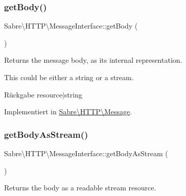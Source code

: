 \mbox{\label{interface_sabre_1_1_h_t_t_p_1_1_message_interface_a0738667a55e423f8510c84035b99f73d}} 
\subsubsection{\texorpdfstring{get\+Body()}{getBody()}}
{\footnotesize\ttfamily Sabre\textbackslash{}\+H\+T\+T\+P\textbackslash{}\+Message\+Interface\+::get\+Body (\begin{DoxyParamCaption}{ }\end{DoxyParamCaption})}

Returns the message body, as it\textquotesingle{}s internal representation.

This could be either a string or a stream.

\begin{DoxyReturn}{Rückgabe}
resource$\vert$string 
\end{DoxyReturn}


Implementiert in \mbox{\hyperlink{class_sabre_1_1_h_t_t_p_1_1_message_adbab038f2bd823f11e4ade75cc792f14}{Sabre\textbackslash{}\+H\+T\+T\+P\textbackslash{}\+Message}}.

\mbox{\label{interface_sabre_1_1_h_t_t_p_1_1_message_interface_a8f6211306846a4789498647c03d02442}} 
\subsubsection{\texorpdfstring{get\+Body\+As\+Stream()}{getBodyAsStream()}}
{\footnotesize\ttfamily Sabre\textbackslash{}\+H\+T\+T\+P\textbackslash{}\+Message\+Interface\+::get\+Body\+As\+Stream (\begin{DoxyParamCaption}{ }\end{DoxyParamCaption})}

Returns the body as a readable stream resource.

